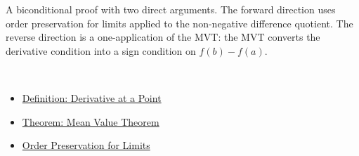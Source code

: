 \begin{remark*}
A biconditional proof with two direct arguments. The forward direction uses order preservation for limits applied to the non-negative difference quotient. The reverse direction is a one-application of the MVT: the MVT converts the derivative condition into a sign condition on $f(b) - f(a)$.
\end{remark*}

\begin{remark*}[Dependencies]~\\
\begin{itemize}
  \item \hyperref[def:derivative-at-a-point]{Definition: Derivative at a Point}
  \item \hyperref[thm:mean-value-theorem]{Theorem: Mean Value Theorem}
  \item \hyperref[thm:order-preservation-limits]{Order Preservation for Limits}
\end{itemize}
\end{remark*}

